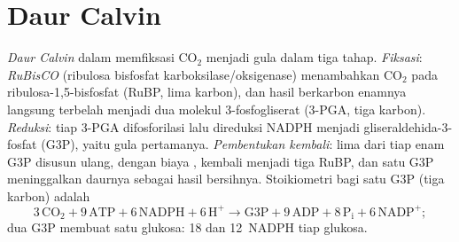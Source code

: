 \section{Daur Calvin}

\begin{definition}\label{def:b1:photosynthesis:fixation}
\emph{Daur Calvin} dalam  memfiksasi $\mathrm{CO_2}$ menjadi
gula dalam tiga tahap. \emph{Fiksasi}: \emph{RuBisCO} (ribulosa
bisfosfat karboksilase/oksigenase) menambahkan $\mathrm{CO_2}$ pada
ribulosa-1,5-bisfosfat (RuBP, lima karbon), dan hasil berkarbon enamnya
langsung terbelah menjadi dua molekul 3-fosfogliserat (3-PGA, tiga
karbon). \emph{Reduksi}: tiap 3-PGA difosforilasi  lalu direduksi
NADPH menjadi gliseraldehida-3-fosfat (G3P), yaitu gula pertamanya.
\emph{Pembentukan kembali}: lima dari tiap enam G3P disusun ulang,
dengan biaya , kembali menjadi tiga RuBP, dan satu G3P meninggalkan
daurnya sebagai hasil bersihnya. Stoikiometri bagi satu G3P (tiga
karbon) adalah
\[
3\,\mathrm{CO_2} + 9\,\mathrm{ATP} + 6\,\mathrm{NADPH} + 6\,\mathrm{H^+}
\to \text{G3P} + 9\,\mathrm{ADP} + 8\,\mathrm{P_i} + 6\,\mathrm{NADP^+} ;
\]
dua G3P membuat satu glukosa: \qty{18}{}  dan \qty{12}{NADPH} tiap glukosa.
\end{definition}

